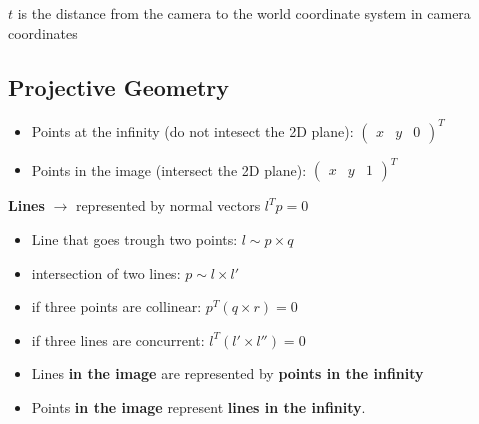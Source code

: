 \alert{$t$ is the distance from the camera to the world coordinate
system in camera coordinates}

\subsection*{Projective Geometry}
\begin{itemize}
  \item Points at the infinity (do not intesect the 2D plane): $\begin{pmatrix} x & y & 0
    \end{pmatrix}^T$
    \item Points in the image (intersect the 2D plane): $\begin{pmatrix} x & y & 1
    \end{pmatrix}^T$
\end{itemize}

\textbf{Lines}
$\rightarrow$ represented by normal vectors 
$l^T p = 0$

\begin{itemize}
 \item Line that goes trough two points:
$l \sim p \times q$
\item intersection of two lines:
$p \sim l \times l'$
\item
if three points are collinear:
$p^T (q \times r) = 0$
\item if three lines are concurrent:
$l^T (l' \times l'') = 0$
\end{itemize}

\begin{itemize}
  \item Lines \textbf{in the image} are represented by \textbf{points in
    the infinity}
  \item Points \textbf{in the image} represent \textbf{lines in the
    infinity}.
\end{itemize}
